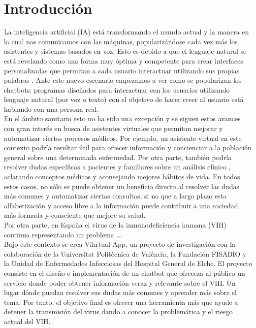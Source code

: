 \section{Introducción}
La inteligencia artificial (IA) está transformando el mundo actual y la manera en la cual nos comunicamos con las máquinas, popularizándose cada vez más los asistentes y sistemas basados en voz. Esto es debido a que el lenguaje natural se está revelando como una forma muy óptima y competente para crear interfaces personalizadas que permitan a cada usuario interactuar utilizando sus propias palabras \cite{naturalDialogue} . Ante este nuevo escenario empezamos a ver como se popularizan los chatbots: programas diseñados para interactuar con los usuarios utilizando lenguaje natural (por voz o texto) con el objetivo de hacer creer al usuario está hablando con una persona real. \\

En el ámbito sanitario esto no ha sido una excepción y se siguen estos avances con gran interés en busca de asistentes virtuales que permitan mejorar y automatizar ciertos procesos médicos\cite{healthAgents}. Por ejemplo, un asistente virtual en este contexto podría resultar útil para ofrecer información y concienciar a la población general sobre una determinada enfermedad. Por otra parte, también podría resolver dudas específicas a pacientes y familiares sobre un análisis clínico \cite{healthAgents}, aclarando conceptos médicos y aconsejando mejores hábitos de vida. En todos estos casos, no sólo se puede obtener un beneficio directo al resolver las dudas más comunes y automatizar ciertas consultas, si no que a largo plazo esta alfabetización y acceso libre a la información puede contribuir a una sociedad más formada y consciente que mejore su salud.\\

Por otra parte, en España el virus de la inmunodeficiencia humana (VIH) continua representando un problema ...\\

Bajo este contexto se crea Vihrtual-App, un proyecto de investigación con la colaboración de la Universitat Politècnica de València, la Fundación FISABIO y la Unidad de Enfermedades Infecciosas del Hospital General de Elche. El proyecto consiste en el diseño e implementación de un chatbot que ofreceza al público un servicio donde poder obtener información veraz y relevante sobre el VIH. Un lugar dónde puedan resolver sus dudas más comunes y aprender más sobre el tema. Por tanto, el objetivo final es ofrecer una herramienta más que ayude a detener la transmisión del virus dando a conocer la problemática y el riesgo actual del VIH.\\ %

